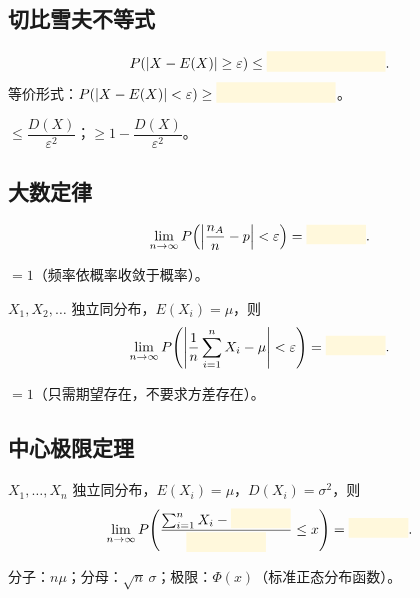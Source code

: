 \documentclass[11pt,a4paper]{article}
\newcommand{\blankbox}[1]{%
  \textcolor{blankyellow}{\rule[-0.1cm]{#1}{0.5cm}}%
}
\begin{document}
\subsection{切比雪夫不等式}

\begin{formulabox}[切比雪夫不等式]
\[P(|X-E(X)|\geq \varepsilon) \leq \blankbox{3cm}.\]
等价形式：$P(|X-E(X)|<\varepsilon) \geq \blankbox{3cm}$。
\end{formulabox}

\begin{answerbox}
$\leq \dfrac{D(X)}{\varepsilon^2}$；$\geq 1-\dfrac{D(X)}{\varepsilon^2}$。
\end{answerbox}

\subsection{大数定律}

\begin{formulabox}[伯努利大数定律]
\[\lim_{n\to\infty} P\!\left(\left|\frac{n_A}{n}-p\right|<\varepsilon\right) = \blankbox{1.5cm}.\]
\end{formulabox}

\begin{answerbox}
$=1$（频率依概率收敛于概率）。
\end{answerbox}

\begin{formulabox}[辛钦大数定律]
$X_1,X_2,\dots$ 独立同分布，$E(X_i)=\mu$，则
\[\lim_{n\to\infty} P\!\left(\left|\frac{1}{n}\sum_{i=1}^n X_i - \mu\right|<\varepsilon\right) = \blankbox{1.5cm}.\]
\end{formulabox}

\begin{answerbox}
$=1$（只需期望存在，不要求方差存在）。
\end{answerbox}

\subsection{中心极限定理}

\begin{formulabox}[独立同分布中心极限定理]
$X_1,\dots,X_n$ 独立同分布，$E(X_i)=\mu$，$D(X_i)=\sigma^2$，则
\[\lim_{n\to\infty} P\!\left(\frac{\sum_{i=1}^n X_i - \blankbox{1.5cm}}{\blankbox{2cm}} \leq x\right) = \blankbox{1.5cm}.\]
\end{formulabox}

\begin{answerbox}
分子：$n\mu$；分母：$\sqrt n\,\sigma$；极限：$\Phi(x)$（标准正态分布函数）。
\end{answerbox}
\end{document}
